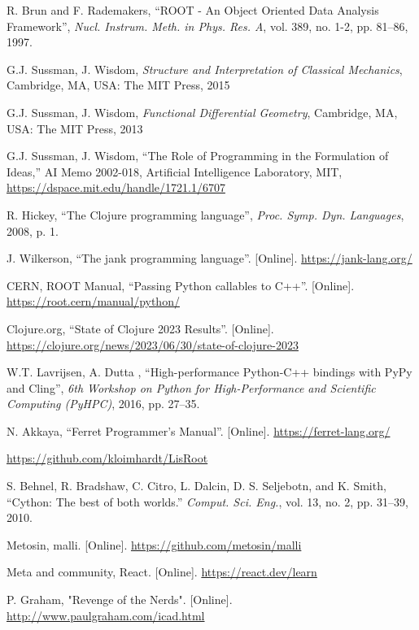\documentclass[twocolumn]{article}
\begin{document}
\begin{thebibliography}{1}
R. Brun and F. Rademakers, “ROOT - An Object Oriented Data Analysis Framework”, \textit{Nucl. Instrum. Meth. in Phys. Res. A}, vol. 389, no. 1-2, pp. 81–86, 1997.

G.J. Sussman, J. Wisdom, \textit{Structure and Interpretation of Classical Mechanics}, Cambridge, MA, USA: The MIT Press, 2015

G.J. Sussman, J. Wisdom, \textit{Functional Differential Geometry}, Cambridge, MA, USA: The MIT Press, 2013

G.J. Sussman, J. Wisdom, “The Role of Programming in the Formulation of Ideas,” AI Memo 2002-018, Artificial Intelligence Laboratory, MIT, \url{https://dspace.mit.edu/handle/1721.1/6707}

R. Hickey, “The Clojure programming language”, \textit{Proc. Symp. Dyn. Languages}, 2008, p. 1.

J. Wilkerson, “The jank programming language”. [Online]. \url{https://jank-lang.org/}

CERN, ROOT Manual, “Passing Python callables to C++”. [Online]. \url{https://root.cern/manual/python/}

Clojure.org, “State of Clojure 2023 Results”. [Online]. \url{https://clojure.org/news/2023/06/30/state-of-clojure-2023}

W.T. Lavrijsen, A. Dutta , “High-performance Python-C++ bindings with PyPy and Cling”, \textit{6th Workshop on Python for High-Performance and Scientific Computing (PyHPC)}, 2016, pp. 27–35.

N. Akkaya, “Ferret Programmer's Manual”. [Online]. \url{https://ferret-lang.org/}

\url{https://github.com/kloimhardt/LisRoot}

S. Behnel,  R. Bradshaw, C. Citro, L. Dalcin, D. S. Seljebotn, and K. Smith, “Cython: The best of both worlds.” \textit{Comput. Sci. Eng.}, vol. 13, no. 2, pp. 31–39, 2010.

Metosin, malli. [Online]. \url{https://github.com/metosin/malli}

Meta and community, React. [Online]. \url{https://react.dev/learn}

P. Graham, "Revenge of the Nerds". [Online]. \url{http://www.paulgraham.com/icad.html}

\end{thebibliography}
\end{document}
